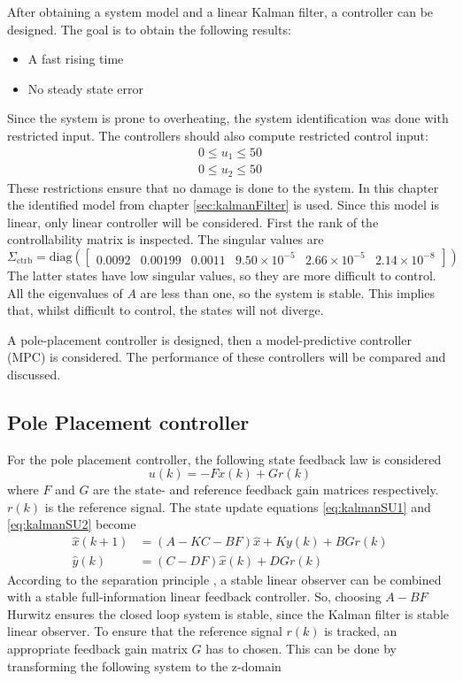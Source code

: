 After obtaining a system model and a linear Kalman filter, a controller can be designed. The goal is to obtain the following results:
\begin{itemize}
    \item A fast rising time
    \item No steady state error
\end{itemize}
Since the system is prone to overheating, the system identification was done with restricted input. The controllers should also compute restricted control input:
\begin{align}
    0\leq u_1 \leq 50 \label{eq:controleffort1} \\
    0\leq u_2 \leq 50 \label{eq:controleffort2}
\end{align}
These restrictions ensure that no damage is done to the system. 
In this chapter the identified model from chapter \ref{sec:kalmanFilter} is used. Since this model is linear, only linear controller will be considered. First the rank of the controllability matrix is inspected. The singular values are
$$
\Sigma_{\text{ctrb}} = \text{diag}(\begin{bmatrix} 0.0092 & 0.00199 & 0.0011 & 9.50\times10^{-5} & 2.66\times10^{-5} & 2.14\times10^{-8}\end{bmatrix})
$$
The latter states have low singular values, so they are more difficult to control. All the eigenvalues of $A$ are less than one, so the system is stable. This implies that, whilst difficult to control, the states will not diverge.

A pole-placement controller is designed, then a model-predictive controller (MPC) is considered. The performance of these controllers will be compared and discussed.
\subsection{Pole Placement controller}\label{sec:polePlacement}
For the pole placement controller, the following state feedback law is considered
$$
u(k) = -Fx(k) + Gr(k)
$$
where $F$ and $G$ are the state- and reference feedback gain matrices respectively. $r(k)$ is the reference signal. The state update equations \ref{eq:kalmanSU1} and \ref{eq:kalmanSU2} become
\begin{align*}
    \hat{x}(k+1) &= (A-KC-BF)\hat{x} + Ky(k) +BGr(k)\\
    \hat{y}(k) &= (C-DF)\hat{x}(k) + DGr(k) 
\end{align*}
According to the separation principle \cite{controlTheory}, a stable linear observer can be combined with a stable full-information linear feedback controller. So, choosing $A-BF$ Hurwitz ensures the closed loop system is stable, since the Kalman filter is stable linear observer. To ensure that the reference signal $r(k)$ is tracked, an appropriate feedback gain matrix $G$ has to chosen. This can be done by transforming the following system to the z-domain

